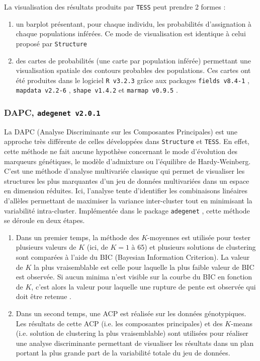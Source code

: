 \documentclass[a4paper,12pt,twoside]{article}\usepackage[]{graphicx}\usepackage[]{color}
\begin{document}
La visualisation des résultats produits par \texttt{TESS} peut prendre 2 formes :
\begin{enumerate}
	\item un barplot présentant, pour chaque individu, les probabilités d'assignation à chaque populations inférées. Ce mode de visualisation est identique à celui proposé par \texttt{Structure}
	\item des cartes de probabilités (une carte par population inférée) permettant une visualisation spatiale des contours probables des populations. Ces cartes ont été produites dans le logiciel \texttt{R~v3.2.3} \citep{rct2015} grâce aux packages \texttt{fields~v8.4-1} \citep{nychka2015}, \texttt{mapdata~v2.2-6} \citep{becker2016}, \texttt{shape~v1.4.2} \citep{soetaert2014} et \texttt{marmap~v0.9.5} \citep{pante2013}.
\end{enumerate}

\subsubsection*{DAPC, \texttt{adegenet~v2.0.1} \citep{jombart2008}}

La DAPC (Analyse Discriminante sur les Composantes Principales) est une approche très différente de celles développées dans \texttt{Structure} et \texttt{TESS}. En effet, cette méthode ne fait aucune hypothèse concernant le mode d'évolution des marqueurs génétiques, le modèle d'admixture ou l'équilibre de Hardy-Weinberg. C'est une méthode d'analyse multivariée classique qui permet de visualiser les structures les plus marquantes d'un jeu de données multivariées dans un espace en dimension réduites. Ici, l'analyse tente d'identifier les combinaisons linéaires d'allèles permettant de maximiser la variance inter-cluster tout en minimisant la variabilité intra-cluster.
Implémentée dans le package \texttt{adegenet} \citep{jombart2008}, cette méthode se déroule en deux étapes.
\begin{enumerate}
	\item Dans un premier temps, la méthode des $K$-moyennes est utilisée pour tester plusieurs valeurs de $K$ (ici, de $K=1$ à 65) et plusieurs solutions de clustering sont comparées à l'aide du BIC (Bayesian Information Criterion). La valeur de $K$ la plus vraisemblable est celle pour laquelle la plus faible valeur de BIC est observée. Si aucun minima n'est visible sur la courbe du BIC en fonction de $K$, c'est alors la valeur pour laquelle une rupture de pente est observée qui doit être retenue \citep{jombart2008}.
	\item Dans un second temps, une ACP est réalisée sur les données génotypiques. Les résultats de cette ACP (i.e. les composantes principales) et des $K$-means (i.e. solution de clustering la plus vraisemblable) sont utilisées pour réaliser une analyse discriminante permettant de visualiser les résultats dans un plan portant la plus grande part de la variabilité totale du jeu de données.\\[1pc]
\end{enumerate}
\end{document}

